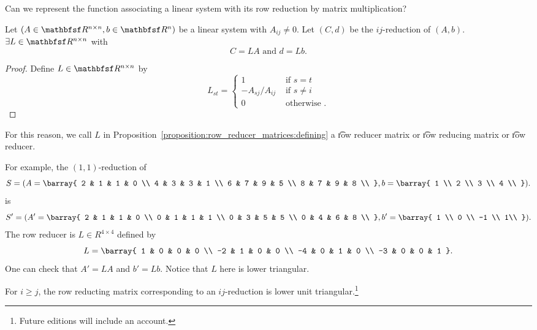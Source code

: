 

Can we represent the function associating a linear system with its row reduction by matrix multiplication?


\begin{proposition}
  Let $(A \in \R^{n \times n}, b \in \R^{n})$ be a linear system with $A_{ij} \neq 0$.
  Let $(C, d)$ be the $ij$-reduction of $(A, b)$.
  $\exists L \in \R^{n \times n}$ with
  \[
    C = LA \text{ and } d = Lb.
  \]
  \begin{proof}
    Define $L \in \R^{n \times n}$ by
    \[
      L_{st} = \begin{cases}
        1 & \text{ if } s = t \\
        -A_{sj}/A_{ij} & \text{ if } s \neq i \\
        0 & \text{ otherwise }.
      \end{cases}
    \]
  \end{proof}
  \label{proposition:row_reducer_matrices:defining}
\end{proposition}
For this reason, we call $L$ in Proposition~\ref{proposition:row_reducer_matrices:defining} a \t{row reducer matrix} or \t{row reducing matrix} or \t{row reducer}.



For example, the $(1,1)$-reduction of
\[
	S = \parens{A = \barray{
	2 & 1 & 1 & 0 \\
	4 & 3 & 3 & 1 \\
	6 & 7 & 9 & 5 \\
	8 & 7 & 9 & 8 \\
	}, b = \barray{
		1 \\
		2 \\
		3 \\
		4 \\
	}}.
\]
is
\[
	S' = \parens{A' = \barray{
	2 & 1 & 1 & 0 \\
	0 & 1 & 1 & 1 \\
	0 & 3 & 5 & 5 \\
	0 & 4 & 6 & 8 \\
	}, b' = \barray{
		1 \\
		0 \\
		-1 \\
		1\\
	}}.
\]
The row reducer is $L \in R^{4 \times 4}$ defined by
\[
  L = \barray{
    1 & 0 & 0 & 0 \\
    -2 & 1 & 0 & 0 \\
    -4 & 0 & 1 & 0 \\
    -3 & 0 & 0 & 1
  }.
\]
One can check that $A' = LA$ and $b' = Lb$.
Notice that $L$ here is lower triangular.


\begin{proposition}
  For $i \geq j$, the row reducting matrix corresponding to an $ij$-reduction is lower unit triangular.\footnote{Future editions will include an account.}
\end{proposition}

\blankpage
